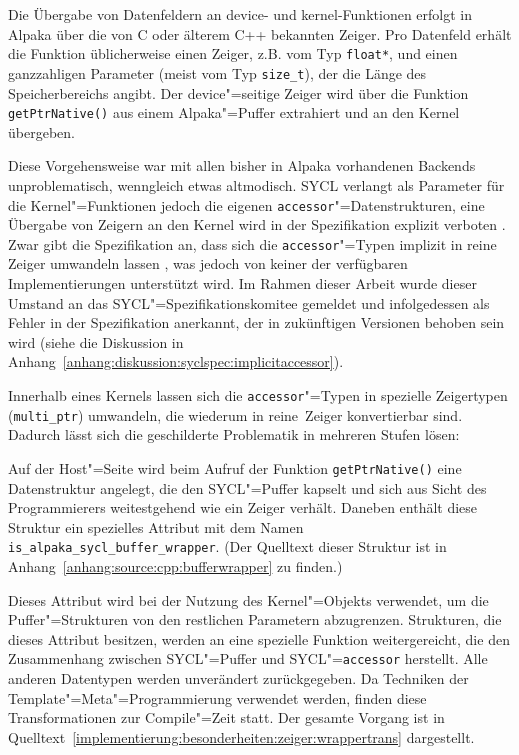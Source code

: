 Die Übergabe von Datenfeldern an \gls{device}- und \gls{kernel}-Funktionen
erfolgt in Alpaka über die von C oder älterem C++ bekannten Zeiger. Pro
Datenfeld erhält die Funktion üblicherweise einen Zeiger, z.B. vom Typ
\texttt{float*}, und einen ganzzahligen Parameter (meist vom Typ
\texttt{size\_t}), der die Länge des Speicherbereichs angibt. Der
device"=seitige Zeiger wird über die Funktion \texttt{getPtrNative()} aus einem
Alpaka"=Puffer extrahiert und an den Kernel übergeben.

Diese Vorgehensweise war mit allen bisher in Alpaka vorhandenen Backends
unproblematisch, wenngleich etwas altmodisch. SYCL verlangt als Parameter für
die Kernel"=Funktionen jedoch die eigenen \texttt{accessor}"=Datenstrukturen,
eine Übergabe von Zeigern an den Kernel wird in der Spezifikation explizit
verboten \cite[vgl.][192]{sycl2019}. Zwar gibt die Spezifikation an, dass sich
die \texttt{accessor}"=Typen implizit in reine Zeiger umwandeln lassen
\cite[vgl.][27]{sycl2019}, was jedoch von keiner der verfügbaren
Implementierungen unterstützt wird. Im Rahmen dieser Arbeit wurde dieser Umstand
an das SYCL"=Spezifikationskomitee gemeldet und infolgedessen als Fehler in der
Spezifikation anerkannt, der in zukünftigen Versionen behoben sein wird (siehe
die Diskussion in Anhang~\ref{anhang:diskussion:syclspec:implicitaccessor}).

Innerhalb eines Kernels lassen sich die \texttt{accessor}"=Typen in spezielle
Zeigertypen (\texttt{multi\_ptr}) umwandeln, die wiederum in \glqq reine\grqq\
Zeiger konvertierbar sind. Dadurch lässt sich die geschilderte Problematik in
mehreren Stufen lösen:

Auf der Host"=Seite wird beim Aufruf der Funktion \texttt{getPtrNative()} eine
Datenstruktur angelegt, die den SYCL"=Puffer kapselt und sich aus Sicht des
Programmierers weitestgehend wie ein Zeiger verhält. Daneben enthält diese
Struktur ein spezielles Attribut mit dem Namen
\texttt{is\_alpaka\_sycl\_buffer\_wrapper}. (Der Quelltext dieser Struktur ist
in Anhang~\ref{anhang:source:cpp:bufferwrapper} zu finden.)

Dieses Attribut wird bei der Nutzung des Kernel"=Objekts verwendet, um die
Puffer"=Strukturen von den restlichen Parametern abzugrenzen. Strukturen, die
dieses Attribut besitzen, werden an eine spezielle Funktion weitergereicht, die
den Zusammenhang zwischen SYCL"=Puffer und SYCL"=\texttt{accessor} herstellt.
Alle anderen Datentypen werden unverändert zurückgegeben. Da Techniken der
Template"=Meta"=Programmierung verwendet werden, finden diese Transformationen
zur Compile"=Zeit statt. Der gesamte Vorgang ist in
Quelltext~\ref{implementierung:besonderheiten:zeiger:wrappertrans} dargestellt.

